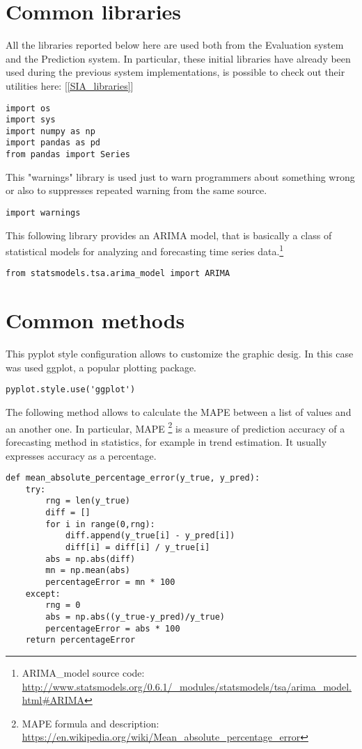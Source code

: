 \section{Common libraries}
\label{Pred_common_libraries}
All the libraries reported below here are used both from the Evaluation system and the Prediction system. In particular, these initial libraries have already been used during the previous system implementations,  is possible to check out their utilities here: [\ref{SIA_libraries}]
\begin{lstlisting}
import os
import sys
import numpy as np
import pandas as pd
from pandas import Series
\end{lstlisting}

This "warnings" library is used just to warn programmers about something wrong or also to suppresses repeated warning from the same source.
\begin{lstlisting}
import warnings
\end{lstlisting}

This following library provides an ARIMA model, that is basically a class of statistical models for analyzing and forecasting time series data.\footnote{ARIMA\_model source code: \\ \url{http://www.statsmodels.org/0.6.1/\_modules/statsmodels/tsa/arima\_model.html\#ARIMA}}
\begin{lstlisting}
from statsmodels.tsa.arima_model import ARIMA
\end{lstlisting}


\newpage

\section{Common methods}
\label{Pred_common_methods}
This pyplot style configuration allows to customize the graphic desig. In this case was used ggplot, a popular plotting package.
\begin{lstlisting}
pyplot.style.use('ggplot')
\end{lstlisting}

The following method allows to calculate the MAPE between a list of values and an another one. In particular, MAPE \footnote{MAPE formula and description: \\ \url{https://en.wikipedia.org/wiki/Mean_absolute_percentage_error}} is a measure of prediction accuracy of a forecasting method in statistics, for example in trend estimation. It usually expresses accuracy as a percentage.
\begin{lstlisting}
def mean_absolute_percentage_error(y_true, y_pred): 
	try:
		rng = len(y_true)
		diff = []
		for i in range(0,rng):
			diff.append(y_true[i] - y_pred[i])
			diff[i] = diff[i] / y_true[i]
		abs = np.abs(diff)
		mn = np.mean(abs)
		percentageError = mn * 100
	except:
		rng = 0
		abs = np.abs((y_true-y_pred)/y_true)
		percentageError = abs * 100
	return percentageError
\end{lstlisting}

